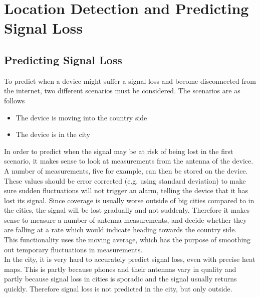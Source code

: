 \section{Location Detection and Predicting Signal Loss}

\subsection{Predicting Signal Loss}
To predict when a device might suffer a signal loss and become disconnected from the internet, two different scenarios must be considered. The scenarios are as follows\\

\begin{itemize}
\item The device is moving into the country side
\item The device is in the city
\end{itemize}

In order to predict when the signal may be at risk of being lost in the first scenario, it makes sense to look at measurements from the antenna of the device. A number of measurements, five for example, can then be stored on the device. These values should be error corrected (e.g. using standard deviation) to make sure sudden fluctuations will not trigger an alarm, telling the device that it has lost its signal. Since coverage is usually worse outside of big cities compared to in the cities, the signal will be lost gradually and not suddenly. Therefore it makes sense to measure a number of antenna measurements, and decide whether they are falling at a rate which would indicate heading towards the country side.\\

This functionality uses the moving average, which has the purpose of smoothing out temporary fluctuations in measurements. \citep{wiki-moving-average}\\

In the city, it is very hard to accurately predict signal loss, even with precise heat maps. This is partly because phones and their antennas vary in quality and partly because signal loss in cities is sporadic and the signal usually returns quickly. Therefore signal loss is not predicted in the city, but only outside. 